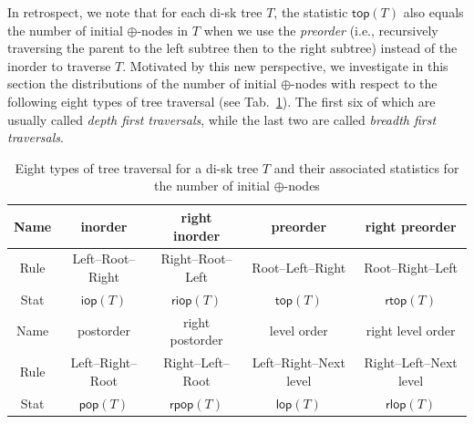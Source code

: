 \documentclass[12pt]{amsart}
\numberwithin{equation}{section}
\theoremstyle{plain}
\theoremstyle{definition}
\def\iop{\mathsf{iop}}
\def\top{\mathsf{top}}
\def\riop{\mathsf{riop}}
\def\rtop{\mathsf{rtop}}
\def\pop{\mathsf{pop}}
\def\lop{\mathsf{lop}}
\def\rpop{\mathsf{rpop}}
\def\rlop{\mathsf{rlop}}
\begin{document}
In retrospect, we note that for each di-sk tree $T$, the statistic $\top(T)$ also equals the number of initial $\oplus$-nodes in $T$ when we use the {\em preorder} (i.e., recursively traversing the parent to the left subtree then to the right subtree) instead of the inorder to traverse $T$. Motivated by this new perspective, we investigate in this  section the distributions of the number of initial $\oplus$-nodes with respect to the following eight types of tree traversal (see Tab.~\ref{eight-tree-tra}). The first six of which are usually called {\em depth first traversals}, while the last two are called {\em breadth first traversals}.

\begin{table}[bp]\caption{Eight types of tree traversal for a di-sk tree $T$ and their associated statistics for the number of initial $\oplus$-nodes}\label{eight-tree-tra}
\centering
\begin{tabular}{|c||c|c|c|c|}
\hline
Name & inorder & right inorder & preorder & right preorder \\
\hline
Rule & Left--Root--Right & Right--Root--Left & Root--Left--Right & Root--Right--Left \\
\hline
Stat & $\iop(T)$ & $\riop(T)$ & $\top(T)$ & $\rtop(T)$ \\
\hline
Name & postorder & right postorder & level order & right level order \\
\hline
Rule & Left--Right--Root & Right--Left--Root & Left--Right--Next level & Right--Left--Next level \\
\hline
Stat & $\pop(T)$ & $\rpop(T)$ & $\lop(T)$ & $\rlop(T)$ \\
\hline
\end{tabular}
\end{table}
\end{document}
